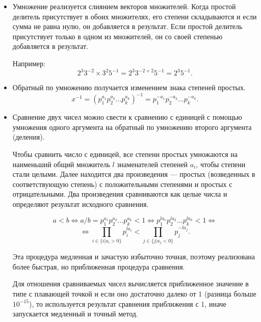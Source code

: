 \documentclass[specialist,
substylefile = spbu.rtx,
               subf,href,colorlinks=true, 12pt]{disser}
\begin{document}
    \begin{itemize}
        \item Умножение реализуется слиянием векторов множителей. Когда простой делитель присутствует в обоих множителях, его степени складываются и если сумма не равна нулю, он добавляется в результат. Если простой делитель присутствует только в одном из множителей, он со своей степенью добавляется в результат.
        
        Например:
        $$ 2^3 3^{-2} \times 3^2 5^{-1} = 2^3 3^{-2+2} 5^{-1} =  2^3 5^{-1}.$$

        \item Обратный по умножению получается изменением знака степеней простых.
        $$ x^{-1} = (p_1^{a_1}p_2^{a_2}\dots p_k^{a_k})^{-1} = p_1^{-a_1}p_2^{-a_2}\dots p_k^{-a_k}.$$

        \item Сравнение двух чисел можно свести к сравнению с единицей с помощью умножения одного аргумента на обратный по умножению второго аргумента (деления).

        Чтобы сравнить число с единицей, все степени простых умножаются на наименьший общий множитель $l$ знаменателей степеней $a_i$, чтобы степени стали целыми. Далее находится два произведения --- простых (возведенных в соответствующую степень) с положительными степенями и простых с отрицательными. Два произведения сравниваются как целые числа и определяют результат исходного сравнения.

        $$a < b \Leftrightarrow a/b = p_1^{a_1}p_2^{a_2}\dots p_k^{a_k} < 1 \Leftrightarrow 
        p_1^{l a_1}p_2^{l a_2}\dots p_k^{l a_k} < 1 \Leftrightarrow $$
        $$\Leftrightarrow
        \prod_{i \in \{i | a_i > 0\}} p_i^{l a_i} < \prod_{j \in \{j | a_j < 0\}} p_j^{-l a_j}.
        $$

        Эта процедура медленная и зачастую избыточно точная, поэтому реализована более быстрая, но приближенная процедура сравнения.
        
        Для отношения сравниваемых чисел вычисляется приближенное значение в типе с плавающей точкой и если оно достаточно далеко от 1 (разница больше $10^{-15}$), то используется результат сравнения приближения с 1, иначе запускается медленный и точный метод.
    \end{itemize}


    
\end{document}
